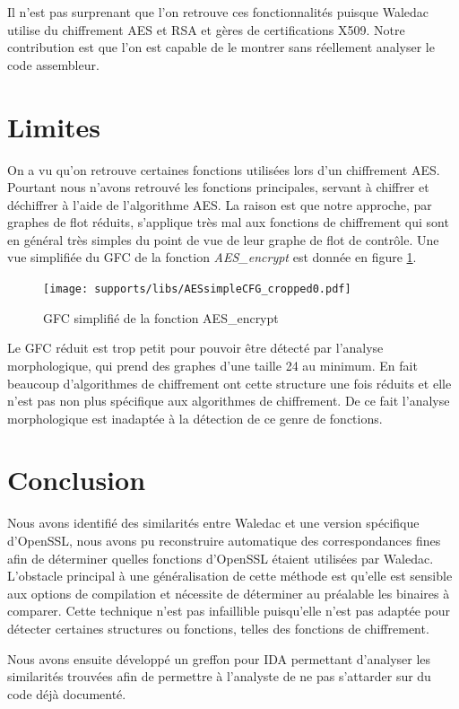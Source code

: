 Il n'est pas surprenant que l'on retrouve ces fonctionnalités puisque Waledac utilise du chiffrement AES et RSA et gères de certifications X509. Notre contribution est que l'on est capable de le montrer sans réellement analyser le code assembleur.

\section{Limites}
On a vu qu'on retrouve certaines fonctions utilisées lors d'un chiffrement AES.
Pourtant nous n'avons retrouvé les fonctions principales, servant à chiffrer et déchiffrer à l'aide de l'algorithme AES.
La raison est que notre approche, par graphes de flot réduits, s'applique très mal aux fonctions de chiffrement qui sont en général très simples du point de vue de leur graphe de flot de contrôle.
Une vue simplifiée du GFC de la fonction \emph{AES\_encrypt} est donnée en figure \ref{fig:AES_encrypt_CFG}.

\begin{figure}[h]
\begin{center}
\texttt{[image: supports/libs/AESsimpleCFG\_cropped0.pdf]}

\end{center}
\caption{GFC simplifié de la fonction AES\_encrypt}
\label{fig:AES_encrypt_CFG}
\end{figure}

Le GFC réduit est trop petit pour pouvoir être détecté par l'analyse morphologique, qui prend des graphes d'une taille 24 au minimum.
En fait beaucoup d'algorithmes de chiffrement ont cette structure une fois réduits et elle n'est pas non plus spécifique aux algorithmes de chiffrement. De ce fait l'analyse morphologique est inadaptée à la détection de ce genre de fonctions.


\section{Conclusion}
Nous avons identifié des similarités entre Waledac et une version spécifique d'OpenSSL, nous avons pu reconstruire automatique des correspondances fines afin de déterminer quelles fonctions d'OpenSSL étaient utilisées par Waledac.
L'obstacle principal à une généralisation de cette méthode est qu'elle est sensible aux options de compilation et nécessite de déterminer au préalable les binaires à comparer.
Cette technique n'est pas infaillible puisqu'elle n'est pas adaptée pour détecter certaines structures ou fonctions, telles des fonctions de chiffrement.

Nous avons ensuite développé un greffon pour IDA permettant d'analyser les similarités trouvées afin de permettre à l'analyste de ne pas s'attarder sur du code déjà documenté.